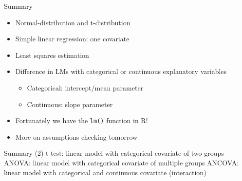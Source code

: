 \documentclass[
  ignorenonframetext,
]{beamer}
\providecommand{\tightlist}{%
  \setlength{\itemsep}{0pt}\setlength{\parskip}{0pt}}
\begin{document}
\begin{frame}[fragile]{Summary}
\label{summary}
\begin{itemize}
\tightlist
\item
  Normal-distribution and t-distribution
\item
  Simple linear regression: one covariate
\item
  Least squares estimation
\item
  Difference in LMs with categorical or continuous explanatory variables

  \begin{itemize}
  \tightlist
  \item
    Categorical: intercept/mean parameter
  \item
    Continuous: slope parameter
  \end{itemize}
\item
  Fortunately we have the \texttt{lm()} function in R!
\item
  More on assumptions checking tomorrow
\end{itemize}
\end{frame}

\begin{frame}{Summary (2)}
\label{summary-2}
t-test: linear model with categorical covariate of two groups ANOVA:
linear model with categorical covariate of multiple groups ANCOVA:
linear model with categorical and continuous covariate (interaction)
\end{frame}
\end{document}
